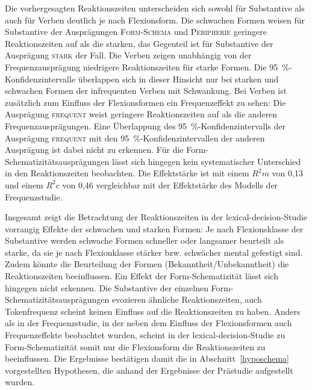 Die vorhergesagten Reaktionszeiten unterscheiden sich sowohl für Substantive als auch für Verben deutlich je nach Flexionsform. Die schwachen Formen weisen für Substantive der Ausprägungen \textsc{Form-Schema} und \textsc{Peripherie} geringere Reaktionszeiten auf als die starken, das Gegenteil ist für Substantive der Ausprägung \textsc{stark} der Fall. Die Verben zeigen unabhängig von der Frequenzausprägung niedrigere Reaktionszeiten für starke Formen. Die 95~\%-Konfidenzintervalle überlappen sich in dieser Hinsicht nur bei starken und schwachen Formen der infrequenten Verben mit Schwankung. Bei Verben ist zusätzlich zum Einfluss der Flexionsformen ein Frequenzeffekt zu sehen: Die Ausprägung \textsc{frequent} weist geringere Reaktionszeiten auf als die anderen Frequenzausprägungen. Eine Überlappung des 95~\%-Konfidenzintervalls der Ausprägung \textsc{frequent} mit den 95~\%-Konfidenzintervallen der anderen Ausprägung ist dabei nicht zu erkennen. Für die Form-Schematizitäts\-aus\-prä\-gungen lässt sich hingegen kein systematischer Unterschied in den Reaktionszeiten beobachten. Die Effektstärke ist mit einem $R^2m$ von 0,13 und einem $R^2c$ von 0,46 vergleichbar mit der Effektstärke des Modells der Frequenzstudie.

Insgesamt zeigt die Betrachtung der Reaktionszeiten in der lexical-decision-Studie vorrangig Effekte der schwachen und starken Formen: Je nach Flexionsklasse der Substantive werden schwache Formen schneller oder langsamer beurteilt als starke, da sie je nach Flexionklasse stärker bzw. schwächer mental gefestigt sind. Zudem könnte die Beurteilung der Formen (Bekanntheit\slash Un\-be\-kannt\-heit) die Reaktionszeiten beeinflussen. Ein Effekt der Form-Schematizität lässt sich hingegen nicht erkennen. Die Substantive der einzelnen Form-Sche\-ma\-ti\-zi\-täts\-aus\-prä\-gun\-gen evozieren ähnliche Reaktionszeiten, auch Tokenfrequenz scheint keinen Einfluss auf die Reaktionszeiten zu haben. Anders als in der Frequenzstudie, in der neben dem Einfluss der Flexionsformen auch Frequenzeffekte beobachtet wurden, scheint in der lexical-decision-Studie zu Form-Schematizität somit nur die Flexionsform die Reaktionszeiten zu beeinflussen. Die Ergebnisse bestätigen damit die in Abschnitt~\ref{hyposchema} vorgestellten Hypothesen, die anhand der Ergebnisse der Prästudie aufgestellt wurden.\largerpage

